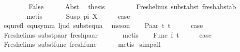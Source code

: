 \begin{isabellebody}
\ \ \isamarkupfalse%
\isanewline
\ \ \ \ \isamarkupfalse%
\ False\isanewline
\ \ \ \ \isamarkupfalse%
\ Abst\ \isamarkupfalse%
\ {\isacharquery}{\kern0pt}thesis\ \isanewline
\ \ \ \ \ \ \isamarkupfalse%
\ Fresh{\isacharunderscore}{\kern0pt}elims{\isacharparenleft}{\kern0pt}{}{\isacharparenright}{\kern0pt}\ subst{\isacharunderscore}{\kern0pt}abst\ fresh{\isacharunderscore}{\kern0pt}abst{\isacharunderscore}{\kern0pt}ab\isanewline
\ \ \ \ \ \ \isamarkupfalse%
\ metis\isanewline
\ \ \isamarkupfalse%
\isanewline
{}\isamarkupfalse%
\isanewline
\ \ \isamarkupfalse%
\ {\isacharparenleft}{\kern0pt}Susp\ pi\ X{\isacharparenright}{\kern0pt}\isanewline
\ \ \isamarkupfalse%
\ \isamarkupfalse%
\ {\isacharquery}{\kern0pt}case\isanewline
\ \ \ \ \isamarkupfalse%
\ equ{\isacharunderscore}{\kern0pt}refl\ equ{\isacharunderscore}{\kern0pt}symm\ l{}{\isacharunderscore}{\kern0pt}jud\ subst{\isacharunderscore}{\kern0pt}equ{\isacharunderscore}{\kern0pt}a\ \isamarkupfalse%
\ meson\isanewline
{}\isamarkupfalse%
\isanewline
\ \ \isamarkupfalse%
\ {\isacharparenleft}{\kern0pt}Paar\ t{}\ t{}{\isacharparenright}{\kern0pt}\isanewline
\ \ \isamarkupfalse%
\ \isamarkupfalse%
\ {\isacharquery}{\kern0pt}case\ \isanewline
\ \ \ \ \isamarkupfalse%
\ Fresh{\isacharunderscore}{\kern0pt}elims{\isacharparenleft}{\kern0pt}{}{\isacharparenright}{\kern0pt}\ subst{\isacharunderscore}{\kern0pt}paar\ fresh{\isacharunderscore}{\kern0pt}paar\ \isanewline
\ \ \ \ \isamarkupfalse%
\ metis\isanewline
{}\isamarkupfalse%
\isanewline
\ \ \isamarkupfalse%
\ {\isacharparenleft}{\kern0pt}Func\ f\ t{\isacharprime}{\kern0pt}{\isacharparenright}{\kern0pt}\isanewline
\ \ \isamarkupfalse%
\ \isamarkupfalse%
\ {\isacharquery}{\kern0pt}case\isanewline
\ \ \ \ \isamarkupfalse%
\ Fresh{\isacharunderscore}{\kern0pt}elims{\isacharparenleft}{\kern0pt}{}{\isacharparenright}{\kern0pt}\ subst{\isacharunderscore}{\kern0pt}func\ fresh{\isacharunderscore}{\kern0pt}func\isanewline
\ \ \ \ \isamarkupfalse%
\ metis\isanewline
{}\isamarkupfalse%
\ {\isacharparenleft}{\kern0pt}simp{\isacharunderscore}{\kern0pt}all{\isacharparenright}{\kern0pt}%

\end{isabellebody}
